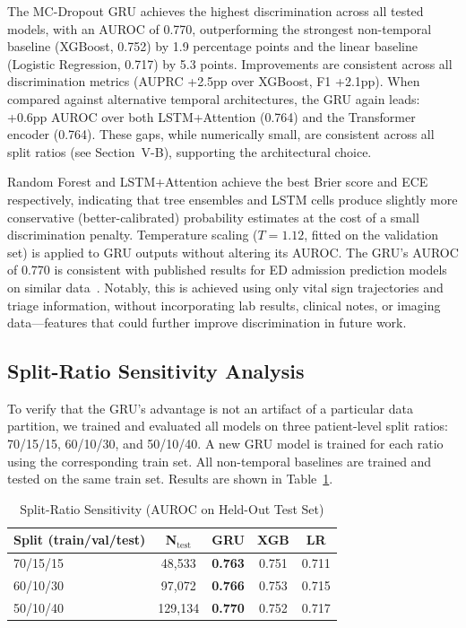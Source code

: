 \documentclass[runningheads]{llncs}
\begin{document}
The MC-Dropout GRU achieves the highest discrimination across all tested models, with an AUROC of 0.770, outperforming the strongest non-temporal baseline (XGBoost, 0.752) by 1.9 percentage points and the linear baseline (Logistic Regression, 0.717) by 5.3 points. Improvements are consistent across all discrimination metrics (AUPRC +2.5pp over XGBoost, F1 +2.1pp). When compared against alternative temporal architectures, the GRU again leads: +0.6pp AUROC over both LSTM+Attention (0.764) and the Transformer encoder (0.764). These gaps, while numerically small, are consistent across all split ratios (see Section~V-B), supporting the architectural choice.

Random Forest and LSTM+Attention achieve the best Brier score and ECE respectively, indicating that tree ensembles and LSTM cells produce slightly more conservative (better-calibrated) probability estimates at the cost of a small discrimination penalty. Temperature scaling ($T=1.12$, fitted on the validation set) is applied to GRU outputs without altering its AUROC. The GRU's AUROC of 0.770 is consistent with published results for ED admission prediction models on similar data~\cite{Xie2022, Raita2019}. Notably, this is achieved using only vital sign trajectories and triage information, without incorporating lab results, clinical notes, or imaging data---features that could further improve discrimination in future work.

\subsection{Split-Ratio Sensitivity Analysis}

To verify that the GRU's advantage is not an artifact of a particular data partition, we trained and evaluated all models on three patient-level split ratios: 70/15/15, 60/10/30, and 50/10/40. A new GRU model is trained for each ratio using the corresponding train set. All non-temporal baselines are trained and tested on the same train set. Results are shown in Table~\ref{tab:split_sensitivity}.

\begin{table}[h]
\caption{Split-Ratio Sensitivity (AUROC on Held-Out Test Set)}
\label{tab:split_sensitivity}
\centering
\begin{tabular}{lcccc}
\toprule
\textbf{Split (train/val/test)} & \textbf{N$_\text{test}$} & \textbf{GRU} & \textbf{XGB} & \textbf{LR} \\
\midrule
70/15/15 & 48{,}533  & \textbf{0.763} & 0.751 & 0.711 \\
60/10/30 & 97{,}072  & \textbf{0.766} & 0.753 & 0.715 \\
50/10/40 & 129{,}134 & \textbf{0.770} & 0.752 & 0.717 \\
\bottomrule
\end{tabular}
\end{table}
\end{document}
